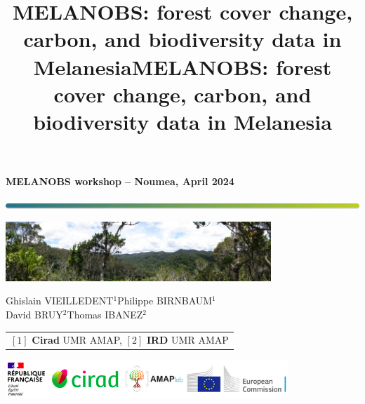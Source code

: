 \documentclass[10pt,table,dvipsnames,compress]{beamer}
\date{}
\title{MELANOBS: forest cover change, carbon, and biodiversity data in Melanesia}
\title[MELANOBS]{MELANOBS: forest cover change, carbon, and biodiversity data in Melanesia}
\begin{document}

{
  \begin{frame}
  \begin{center}
  \small{\textbf{MELANOBS workshop -- Noumea, April 2024}}
  \end{center}
  \vspace{-0.5cm}
  \titlepage %
  \vspace{-3cm}
  \begin{center}
    \includegraphics[width=\textwidth]{figs/Barre_couleur}
    
    \vspace{0.25cm}
    
    \includegraphics[width=10cm]{figs/Banniere}
    
    \small{Ghislain VIEILLEDENT$^{1}$\hspace{0.25cm}Philippe BIRNBAUM$^{1}$\\
      \vspace{0.10cm}David BRUY$^{2}$\hspace{0.25cm}Thomas IBANEZ$^{2}$}
      
    \vspace{0.25cm}
    
    {\scriptsize
      \begin{tabular}{l}
        $[1]$ \textbf{Cirad} UMR AMAP, $[2]$ \textbf{IRD} UMR AMAP
      \end{tabular}
    }
    
    \includegraphics[width=0.8\textwidth]{figs/partners_logos}
    
  \end{center}
  \end{frame}
}
\end{document}
